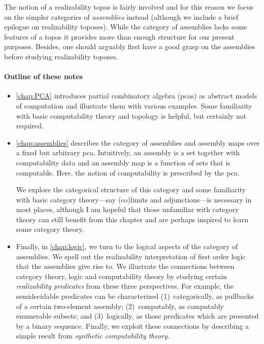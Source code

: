 The notion of a realizability topos is fairly involved and for this reason we
focus on the simpler categories of \emph{assemblies} instead (although we
include a brief epilogue on realizability toposes).
%
While the category of assemblies lacks some features of a topos it provides more
than enough structure for our present purposes. Besides, one should arguably
first have a good grasp on the assemblies before studying realizability toposes.

\paragraph{Outline of these notes}
\begin{itemize}
\item \cref{chap:PCA} introduces partial combinatory algebra (pcas) as
  abstract models of computation and illustrate them with various examples.
  Some familiarity with basic computability theory and topology is
  helpful, but certainly not required.
\item \cref{chap:assemblies} describes the category of assemblies and assembly maps
  over a fixed but arbitrary pca.
  Intuitively, an assembly is a set together with computability data and an
  assembly map is a function of sets that is computable. Here, the notion of
  computability is prescribed by the pca.

  We explore the categorical structure of this category and some familiarity
  with basic category theory---say (co)limits and adjunctions---is necessary in
  most places, although I am hopeful that those unfamiliar with category theory
  can still benefit from this chapter and are perhaps inspired to learn some
  category theory.
\item
  Finally, in \cref{chap:logic}, we turn to the logical aspects of the category
  of assemblies.
  We spell out the realizability interpretation of first order logic that the
  assemblies give rise to.
  We illustrate the connections between category theory, logic and computability
  theory by studying certain \emph{realizability predicates} from these three
  perspectives. For example, the semidecidable predicates can be characterized
  (1)~categorically, as pullbacks of a certain two-element assembly;
  (2)~computably, as computably enumerable subsets; and (3)~logically, as those
  predicates which are presented by a binary sequence.
  Finally, we exploit these connections by describing a simple result from
  \emph{synthetic computability theory}.
\end{itemize}


